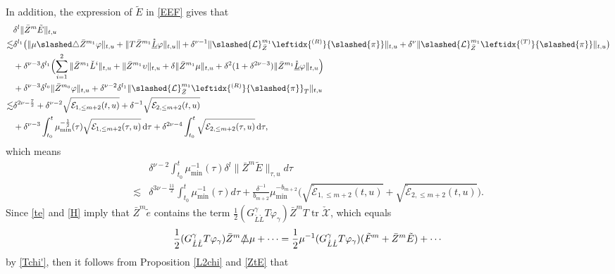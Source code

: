 \documentclass[11pt,twoside]{article}
\def\de{\delta}
\def\vp{\varphi}
\def\f{\frac}
\begin{document}
In addition, the expression of $\tilde E$ in \eqref{EEF} gives that
\begin{align}
&\delta^l\|\bar Z^m\tilde E\|_{t,u}\nonumber\\
\lesssim & \de^{l_1}\bigl(\|\mu\slashed\triangle\bar Z^{m_1}\vp\|_{t,u}+\|T\bar Z^{m_1}\mathring{\underline L}\vp\|_{t,u}\|+\delta^{\nu-1}\|\slashed{\mathcal{L}}_{\bar{Z}}^{m_1}\leftidx{^{(R)}}{\slashed{\pi}}\|_{t,u}
+\delta^\nu\|\slashed{\mathcal{L}}_{\bar{Z}}^{m_1}\leftidx{^{(T)}}{\slashed{\pi}}\|_{t,u}\bigr)\nonumber\\
&+\delta^{\nu-3}\delta^{l_1}\Bigl(\sum_{i=1}^2\|\bar Z^{m_1}\check L^i\|_{t,u}+\|\bar Z^{m_1}\upsilon\|_{t,u}+\delta\|\bar Z^{m_1}\mu\|_{t,u}+\delta^{2}(1+\delta^{2\nu-3})\|\bar Z^{m_1}\mathring{\underline L}\vp\|_{t,u}\Bigr)\nonumber\\
&+\delta^{\nu-3}\delta^{l_0}\|\bar Z^{m_0}\vp\|_{t,u}+\delta^{\nu-2}\delta^{l_1}\|\slashed{\mathcal{L}}_{\bar{Z}}^{m_1}\leftidx{^{(R)}}{\slashed{\pi}}_T\|_{t,u} \nonumber\\
\lesssim &\delta^{2\nu-\f72}
+\delta^{\nu-2}\sqrt{\mathcal{E}_{1,\leq m+2}(t,u)}
+\delta^{-1}\sqrt{\mathcal{E}_{2,\leq m+2}(t,u)} \label{ZtE}\\
&+\delta^{\nu-3}\int_{t_0}^t\mu_{\min}^{-\f12}(\tau)\sqrt{\mathcal{E}_{1,\leq m+2}(\tau,u)}\,\mathrm{d}\tau
+\delta^{2\nu-4}\int_{t_0}^t\sqrt{\mathcal{E}_{2,\leq m+2}(\tau,u)}\,\mathrm{d}\tau,\nonumber
\end{align}
which means
\begin{equation}\label{ZmE}
\begin{split}
&\delta^{\nu-2}\int_{t_0}^t\mu_{\min}^{-1}(\tau)\delta^l\|\bar Z^m\tilde E\|_{\tau,u}d\tau\\
\lesssim&\delta^{3\nu-\f{11}2}\int_{t_0}^t\mu_{\min}^{-1}(\tau)d\tau+\f{\delta^{-1}}{b_{m+2}}\mu_{\min}^{-b_{m+2}}
\big(\sqrt{\widetilde{\mathcal{E}}_{1,\leq m+2}(t,u)} + \sqrt{\widetilde{\mathcal{E}}_{2,\leq m+2}(t,u)}\big).
\end{split}
\end{equation}
Since \eqref{te} and \eqref{H} imply that $\bar{Z}^m \tilde{e}$ contains the term
$\frac{1}{2}(G_{\mathring{L}\mathring{L}}^\gamma T\varphi_\gamma) \bar{Z}^m T\operatorname{tr}\check{\mathscr{X}}$,
which equals
\[
\frac{1}{2} (G_{\mathring{L}\mathring{L}}^\gamma T\varphi_\gamma) \bar{Z}^m \slashed{\triangle}\mu
+ \cdots=\frac{1}{2} \mu^{-1}( G_{\mathring{L}\mathring{L}}^\gamma T\varphi_\gamma)(\tilde F^m+\bar Z^m\tilde E)+\cdots
\]
by \eqref{Tchi'}, then it follows from Proposition \ref{L2chi} and \eqref{ZtE} that
\end{document}
